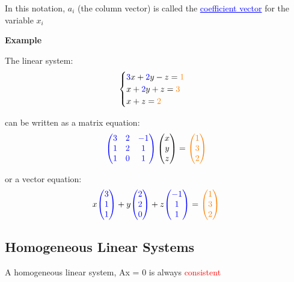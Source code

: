 \documentclass{article}
\newcommand{\bul}[1]{\textcolor{blue}{\underline{#1}}}
\begin{document}
In this notation, $a_i$ (the column vector) is called the \bul{coefficient vector} for the variable $x_i$

\vspace{10pt}

\textbf{Example}

\vspace{10pt}

The linear system:
\[
\begin{cases}
\textcolor{blue}{3}x + \textcolor{blue}{2}y - z = \textcolor{orange}{1} \\
x + \textcolor{blue}{2}y + z = \textcolor{orange}{3} \\
x + z = \textcolor{orange}{2}
\end{cases}
\]

can be written as a matrix equation:
\[
\textcolor{blue}{
\begin{pmatrix}
3 & 2 & -1 \\
1 & 2 & 1 \\
1 & 0 & 1
\end{pmatrix}
}
\begin{pmatrix}
x \\
y \\
z
\end{pmatrix}
=
\textcolor{orange}{
\begin{pmatrix}
1 \\
3 \\
2
\end{pmatrix}
}
\]

or a vector equation:
\[
x \textcolor{blue}{
\begin{pmatrix}
3 \\
1 \\
1
\end{pmatrix}
} + 
y \textcolor{blue}{
\begin{pmatrix}
2 \\
2 \\
0
\end{pmatrix}
} + 
z \textcolor{blue}{
\begin{pmatrix}
-1 \\
1 \\
1
\end{pmatrix}
} =
\textcolor{orange}{
\begin{pmatrix}
1 \\
3 \\
2
\end{pmatrix}
}
\]

\subsection{Homogeneous Linear Systems}
A homogeneous linear system, Ax = 0 is always \textcolor{red}{consistent}
\end{document}

